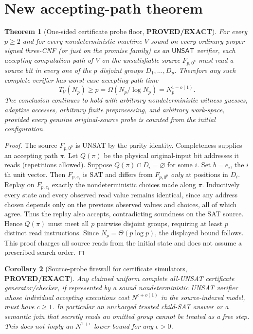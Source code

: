 \documentclass[11pt]{article}
\newtheorem{theorem}{Theorem}
\newtheorem{corollary}[theorem]{Corollary}
\newcommand{\UNSAT}{\mathsf{UNSAT}}
\newcommand{\PROVED}{\textbf{PROVED/EXACT}}
\begin{document}
\section{New accepting-path theorem}
\begin{theorem}[One-sided certificate probe floor, \PROVED]\label{thm:paths}
For every $p\ge2$ and for every nondeterministic machine $V$ sound on every ordinary proper signed three-CNF (or just on the promise family) as an $\UNSAT$ verifier, each accepting computation path of $V$ on the \emph{unsatisfiable} source $F_{p,0^p}$ must read a source bit in every one of the $p$ disjoint groups $D_1,\ldots,D_p$. Therefore any such complete verifier has worst-case accepting-path time
\[
 T_V(N_p)\ge p=\Omega(N_p/\log N_p)=N_p^{1-o(1)}.
\]
The conclusion continues to hold with arbitrary nondeterministic witness guesses, adaptive accesses, arbitrary finite preprocessing, and arbitrary work-space, provided every genuine original-source probe is counted from the initial configuration.
\end{theorem}
\begin{proof}
The source $F_{p,0^p}$ is UNSAT by the parity identity. Completeness supplies an accepting path $\pi$. Let $Q(\pi)$ be the physical original-input bit addresses it reads (repetitions allowed). Suppose $Q(\pi)\cap D_i=\varnothing$ for some $i$. Set $b=e_i$, the $i$th unit vector. Then $F_{p,e_i}$ is SAT and differs from $F_{p,0^p}$ \emph{only} at positions in $D_i$. Replay on $F_{p,e_i}$ exactly the nondeterministic choices made along $\pi$. Inductively every state and every observed read value remains identical, since any address chosen depends only on the previous observed values and choices, all of which agree. Thus the replay also accepts, contradicting soundness on the SAT source. Hence $Q(\pi)$ must meet all $p$ pairwise disjoint groups, requiring at least $p$ distinct read instructions. Since $N_p=\Theta(p\log p)$, the displayed bound follows. This proof charges all source reads from the initial state and does not assume a prescribed search order.\qedhere
\end{proof}
\begin{corollary}[Source-probe firewall for certificate simulators, \PROVED]
Any claimed uniform complete all-UNSAT certificate generator/checker, if represented by a sound nondeterministic UNSAT verifier whose individual accepting executions cost $N^{c+o(1)}$ in the source-indexed model, must have $c\ge1$. In particular an uncharged trusted child-SAT answer or a semantic join that secretly reads an omitted group cannot be treated as a free step. This does \emph{not} imply an $N^{1+\epsilon}$ lower bound for any $\epsilon>0$.
\end{corollary}
\end{document}
